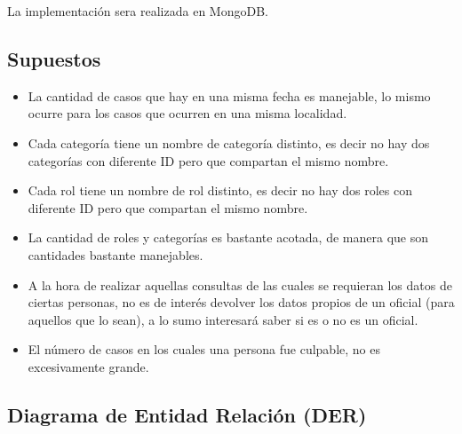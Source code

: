 \documentclass{article}
\theoremstyle{definition}
\theoremstyle{remark}
\begin{document}
La implementación sera realizada en MongoDB.

\subsection{Supuestos}

\begin{itemize}

\item La cantidad de casos que hay en una misma fecha es manejable, lo mismo ocurre para los casos que ocurren en una misma localidad.

\item Cada categoría tiene un nombre de categoría distinto, es decir no hay dos categorías con diferente ID pero que compartan el mismo nombre.

\item Cada rol tiene un nombre de rol distinto, es decir no hay dos roles con diferente ID pero que compartan el mismo nombre.

\item La cantidad de roles y categorías es bastante acotada, de manera que son cantidades bastante manejables.

\item A la hora de realizar aquellas consultas de las cuales se requieran los datos de ciertas personas, no es de interés devolver los datos propios de un oficial (para aquellos que lo sean), a lo sumo interesará saber si es o no es un oficial.

\item El número de casos en los cuales una persona fue culpable, no es excesivamente grande. 

\end{itemize}

\subsection{Diagrama de Entidad Relación (DER)}
\end{document}
